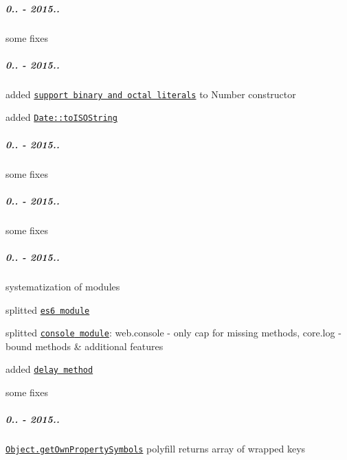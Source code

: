 \subparagraph*{0.. -\/ 2015..}


\begin{DoxyItemize}
\item some fixes
\end{DoxyItemize}

\subparagraph*{0.. -\/ 2015..}


\begin{DoxyItemize}
\item added \href{https://github.com/zloirock/core-js/#ecmascript-6-number}{\tt support binary and octal literals} to {\ttfamily Number} constructor
\item added \href{https://github.com/zloirock/core-js/#ecmascript-5}{\tt {\ttfamily Date\+::to\+I\+S\+O\+String}}
\end{DoxyItemize}

\subparagraph*{0.. -\/ 2015..}


\begin{DoxyItemize}
\item some fixes
\end{DoxyItemize}

\subparagraph*{0.. -\/ 2015..}


\begin{DoxyItemize}
\item some fixes
\end{DoxyItemize}

\subparagraph*{0.. -\/ 2015..}


\begin{DoxyItemize}
\item systematization of modules
\item splitted \href{https://github.com/zloirock/core-js/#ecmascript-6}{\tt {\ttfamily es6} module}
\item splitted \href{https://github.com/zloirock/core-js/#console}{\tt {\ttfamily console} module}\+: {\ttfamily web.\+console} -\/ only cap for missing methods, {\ttfamily core.\+log} -\/ bound methods \& additional features
\item added \href{https://github.com/zloirock/core-js/#delay}{\tt {\ttfamily delay} method}
\item some fixes
\end{DoxyItemize}

\subparagraph*{0.. -\/ 2015..}


\begin{DoxyItemize}
\item \href{https://github.com/zloirock/core-js/#ecmascript-6-symbol}{\tt {\ttfamily Object.\+get\+Own\+Property\+Symbols}} polyfill returns array of wrapped keys
\end{DoxyItemize}

